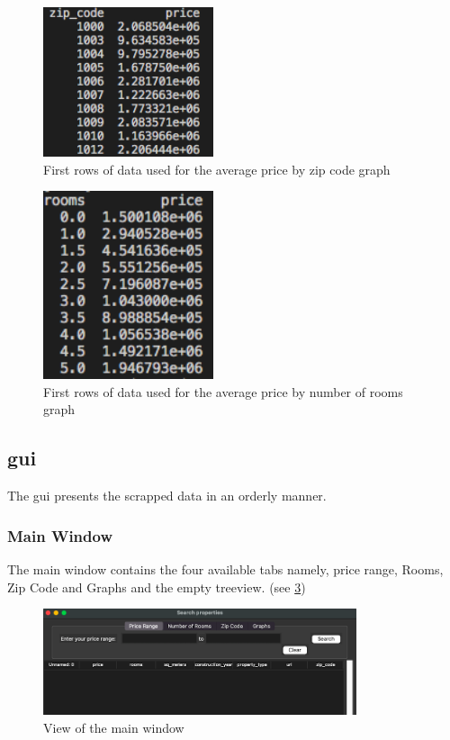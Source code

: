 \documentclass[main]{subfiles}
\begin{document}
\begin{figure}[htbp]
    \centerline{
        \includegraphics[width = 50mm]{prog_16.png}}
    \caption{First rows of data used for the average price by zip code graph}
    \label{fig:graph1}
\end{figure}

\begin{figure}[htbp]
    \centerline{
        \includegraphics[width = 50mm]{prog_17.png}}
    \caption{First rows of data used for the average price by number of rooms graph}
    \label{fig:graph2}
\end{figure}



\subsection{\ac{gui}}
The \ac{gui} presents the scrapped data in an orderly manner.


\subsubsection{Main Window}
The main window contains the four available tabs namely, price range, Rooms, 
Zip Code and Graphs and the empty treeview. (see \ref{fig:Main_Window})

\begin{figure}[htbp]
    \centerline{
        \includegraphics[width = 92mm]{prog_7.png}}
    \caption{View of the main window}
    \label{fig:Main_Window}
\end{figure}
\end{document}
